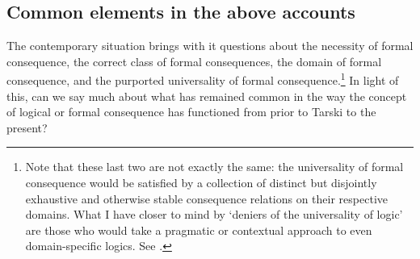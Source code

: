 \documentclass[]{article}
\begin{document}
\subsection{Common elements in the above accounts}
The contemporary situation brings with it questions about the necessity of formal consequence, the correct class of formal consequences, the domain of formal consequence, and the purported universality of formal consequence.\footnote{Note that these last two are not exactly the same: the universality of formal consequence would be satisfied by a collection of distinct but disjointly exhaustive and otherwise stable consequence relations on their respective domains. What I have closer to mind by `deniers of the universality of logic' are those who would take a pragmatic or contextual approach to even domain-specific logics. See \cite[esp. 410-414]{Mehlberg1960}.} In light of this, can we say much about what has remained common in the way the concept of logical or formal consequence has functioned from prior to Tarski to the present?
\end{document}
